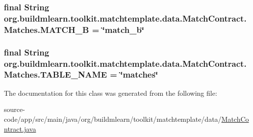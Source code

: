 \subsubsection[{\texorpdfstring{M\+A\+T\+C\+H\+\_\+B}{MATCH_B}}]{\setlength{\rightskip}{0pt plus 5cm}final String org.\+buildmlearn.\+toolkit.\+matchtemplate.\+data.\+Match\+Contract.\+Matches.\+M\+A\+T\+C\+H\+\_\+B = \char`\"{}match\+\_\+b\char`\"{}\hspace{0.3cm}{\ttfamily [static]}}\hypertarget{classorg_1_1buildmlearn_1_1toolkit_1_1matchtemplate_1_1data_1_1MatchContract_1_1Matches_ad909622a9825441c52671642d23600a7}{}\label{classorg_1_1buildmlearn_1_1toolkit_1_1matchtemplate_1_1data_1_1MatchContract_1_1Matches_ad909622a9825441c52671642d23600a7}
\subsubsection[{\texorpdfstring{T\+A\+B\+L\+E\+\_\+\+N\+A\+ME}{TABLE_NAME}}]{\setlength{\rightskip}{0pt plus 5cm}final String org.\+buildmlearn.\+toolkit.\+matchtemplate.\+data.\+Match\+Contract.\+Matches.\+T\+A\+B\+L\+E\+\_\+\+N\+A\+ME = \char`\"{}matches\char`\"{}\hspace{0.3cm}{\ttfamily [static]}}\hypertarget{classorg_1_1buildmlearn_1_1toolkit_1_1matchtemplate_1_1data_1_1MatchContract_1_1Matches_a3447c3266480981f7f6521c2dba8d3f3}{}\label{classorg_1_1buildmlearn_1_1toolkit_1_1matchtemplate_1_1data_1_1MatchContract_1_1Matches_a3447c3266480981f7f6521c2dba8d3f3}


The documentation for this class was generated from the following file\+:\begin{DoxyCompactItemize}
\item 
source-\/code/app/src/main/java/org/buildmlearn/toolkit/matchtemplate/data/\hyperlink{MatchContract_8java}{Match\+Contract.\+java}\end{DoxyCompactItemize}

